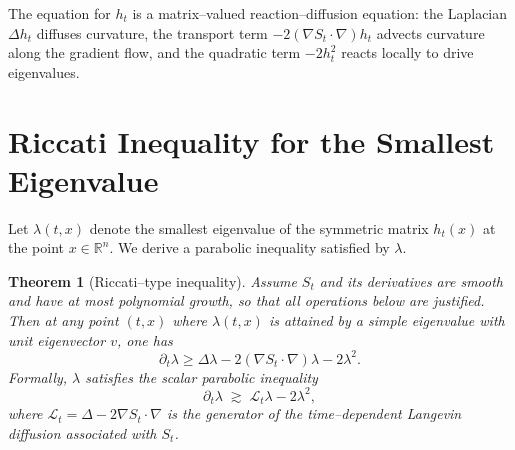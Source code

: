 \documentclass[11pt]{article}
\newtheorem{theorem}{Theorem}[section]
\begin{document}
The equation for $h_t$ is a matrix--valued reaction--diffusion equation:
the Laplacian $\Delta h_t$ diffuses curvature, the transport term
$-2(\nabla S_t\cdot\nabla)h_t$ advects curvature along the gradient
flow, and the quadratic term $-2h_t^2$ reacts locally to drive
eigenvalues.

\section{Riccati Inequality for the Smallest Eigenvalue}

Let $\lambda(t,x)$ denote the smallest eigenvalue of the symmetric matrix
$h_t(x)$ at the point $x\in\mathbb{R}^n$.  We derive a parabolic
inequality satisfied by $\lambda$.

\begin{theorem}[Riccati--type inequality]
Assume $S_t$ and its derivatives are smooth and have at most polynomial
growth, so that all operations below are justified.  Then at any point
$(t,x)$ where $\lambda(t,x)$ is attained by a simple eigenvalue with
unit eigenvector $v$, one has
\begin{equation}
  \partial_t\lambda
  \ge \Delta\lambda - 2(\nabla S_t\cdot\nabla)\lambda - 2\lambda^2.
\end{equation}
Formally, $\lambda$ satisfies the scalar parabolic inequality
\begin{equation}
  \partial_t\lambda
  \;\gtrsim\; \mathcal{L}_t\lambda - 2\lambda^2,
\end{equation}
where $\mathcal{L}_t = \Delta - 2\nabla S_t\cdot\nabla$ is the generator
of the time--dependent Langevin diffusion associated with $S_t$.
\end{theorem}
\end{document}
